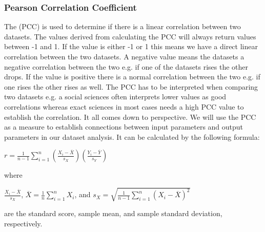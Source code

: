 \subsubsection{Pearson Correlation Coefficient} \label{sec:Pearsons}
The (PCC) is used to determine if there is a linear correlation between two datasets. The values derived from calculating the PCC will always return values between -1 and 1. If the value is either -1 or 1 this means we have a direct linear correlation between the two datasets. A negative value means the datasets a negative correlation between the two e.g. if one of the datasets rises the other drops. If the value is positive there is a normal correlation between the two e.g. if one rises the other rises as well. The PCC has to be interpreted when comparing two datasets e.g. a social sciences often interprets lower values as good correlations whereas exact sciences in most cases needs a high PCC value to establish the correlation. It all comes down to perspective. We will use the PCC as a measure to establish connections between input parameters and output parameters in our dataset analysis. It can be calculated by the following formula:

\begin{center}
$ r = \frac{1}{n-1}\sum_{i=1}^{n}(\frac{X_i-\overline{X}}{s_X})(\frac{Y_i-\overline{Y}}{s_Y})$
\end{center}

\noindent where 

\begin{center}
$ \frac{X_i-\overline{X}}{s_X}$,   $\overline{X} = \frac{1}{n}\sum_{i=1}^{n}X_i$,   and $s_X = \sqrt{\frac{1}{n-1}\sum_{i=1}^{n}(X_i-\overline{X})^2}$
\end{center}

\noindent are the standard score, sample mean, and sample standard deviation, respectively.